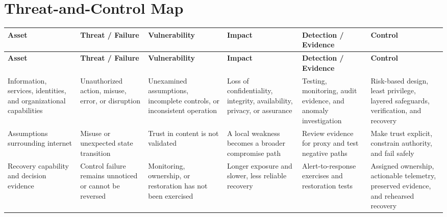 \documentclass[11pt]{article}
\begin{document}
\section*{Threat-and-Control Map}
\begingroup\scriptsize\setlength{\tabcolsep}{2pt}
\begin{longtable}{>{\RaggedRight\arraybackslash}p{}>{\RaggedRight\arraybackslash}p{}>{\RaggedRight\arraybackslash}p{}>{\RaggedRight\arraybackslash}p{}>{\RaggedRight\arraybackslash}p{}>{\RaggedRight\arraybackslash}p{}}
\toprule\rowcolor{Navy}\color{white}\textbf{Asset} & \color{white}\textbf{Threat / Failure} & \color{white}\textbf{Vulnerability} & \color{white}\textbf{Impact} & \color{white}\textbf{Detection / Evidence} & \color{white}\textbf{Control}\\\midrule
\endfirsthead
\toprule\rowcolor{Navy}\color{white}\textbf{Asset} & \color{white}\textbf{Threat / Failure} & \color{white}\textbf{Vulnerability} & \color{white}\textbf{Impact} & \color{white}\textbf{Detection / Evidence} & \color{white}\textbf{Control}\\\midrule
\endhead
Information, services, identities, and organizational capabilities & Unauthorized action, misuse, error, or disruption & Unexamined assumptions, incomplete controls, or inconsistent operation & Loss of confidentiality, integrity, availability, privacy, or assurance & Testing, monitoring, audit evidence, and anomaly investigation & Risk-based design, least privilege, layered safeguards, verification, and recovery\\\midrule
Assumptions surrounding internet & Misuse or unexpected state transition & Trust in content is not validated & A local weakness becomes a broader compromise path & Review evidence for proxy and test negative paths & Make trust explicit, constrain authority, and fail safely\\\midrule
Recovery capability and decision evidence & Control failure remains unnoticed or cannot be reversed & Monitoring, ownership, or restoration has not been exercised & Longer exposure and slower, less reliable recovery & Alert-to-response exercises and restoration tests & Assigned ownership, actionable telemetry, preserved evidence, and rehearsed recovery\\\midrule
\bottomrule
\end{longtable}
\endgroup
\end{document}
